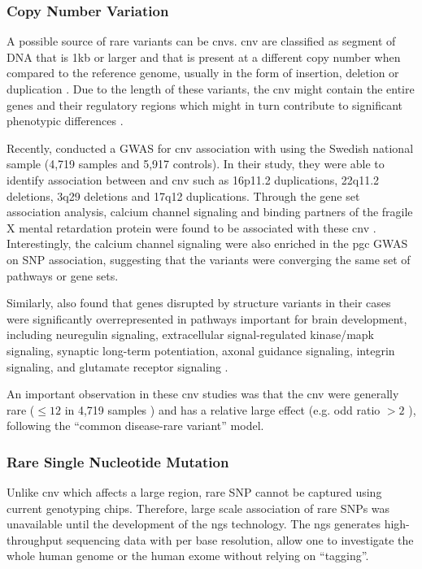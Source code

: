 \documentclass[12pt]{scrbook}
\newcommand*{\glng}{\glsentrylong}
\begin{document}
	\subsubsection{Copy Number Variation}
	A possible source of rare variants can be \glspl{cnv}.
	\gls{cnv} are classified as segment of DNA that is 1\gls{kb} or larger and that is present at a different copy number when compared to the reference genome, usually in the form of insertion, deletion or duplication \citep{Feuk2006}.
	Due to the length of these variants, the \gls{cnv} might contain the entire genes and their regulatory regions which might in turn contribute to significant phenotypic differences \citep{Feuk2006}.
	
	Recently, \citet{Szatkiewicz2014} conducted a \gls{GWAS} for \gls{cnv} association with \glng{scz} using the Swedish national sample (4,719 \glng{scz} samples and 5,917 controls).
	In their study, they were able to identify association between \glng{scz} and \gls{cnv} such as 16p11.2 duplications, 22q11.2 deletions, 3q29 deletions and 17q12 duplications.
	Through the gene set association analysis, calcium channel signaling and binding partners of the fragile X mental retardation protein were found to be associated with these \gls{cnv} \citep{Szatkiewicz2014}.
	Interestingly, the calcium channel signaling were also enriched in the \gls{pgc} \gls{GWAS} on \gls{SNP} association, suggesting that the variants were converging the same set of pathways or gene sets. 
	
	Similarly, \citet{Walsh2008} also found that genes disrupted by structure variants in their cases were significantly overrepresented in pathways important for brain development, including neuregulin signaling, extracellular signal-regulated kinase/\gls{mapk} signaling, 
	synaptic long-term potentiation, axonal guidance signaling, integrin signaling, and glutamate receptor signaling \citep{Walsh2008}.
	
	An important observation in these \gls{cnv} studies was that the \gls{cnv}  were generally rare ($\le12$ in 4,719 samples \citep{Szatkiewicz2014}) and has a relative large effect (e.g. odd ratio $>2$ \citep{Szatkiewicz2014,Walsh2008}), following the ``common disease-rare variant'' model.
	
	\subsubsection{Rare Single Nucleotide Mutation}
	Unlike \gls{cnv} which affects a large region, rare \gls{SNP} cannot be captured using current genotyping chips.
	Therefore, large scale association of rare \glspl{SNP} was unavailable until the development of the \gls{ngs} technology.
	The \gls{ngs} generates high-throughput sequencing data with per base resolution, allow one to investigate the whole human genome or the human exome without relying on ``tagging''.
	
\end{document}
